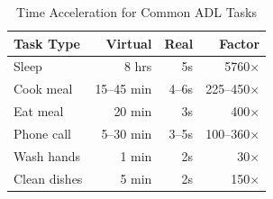 \begin{table}[t]
\centering
\caption{Time Acceleration for Common ADL Tasks}
\label{tab:time_acceleration_compact}
\begin{tabular}{@{}lrrr@{}}
\toprule
\textbf{Task Type} & \textbf{Virtual} & \textbf{Real} & \textbf{Factor} \\
\midrule
Sleep & 8 hrs & 5s & 5760$\times$ \\
Cook meal & 15--45 min & 4--6s & 225--450$\times$ \\
Eat meal & 20 min & 3s & 400$\times$ \\
Phone call & 5--30 min & 3--5s & 100--360$\times$ \\
Wash hands & 1 min & 2s & 30$\times$ \\
Clean dishes & 5 min & 2s & 150$\times$ \\
\bottomrule
\end{tabular}
\end{table}



%


%







